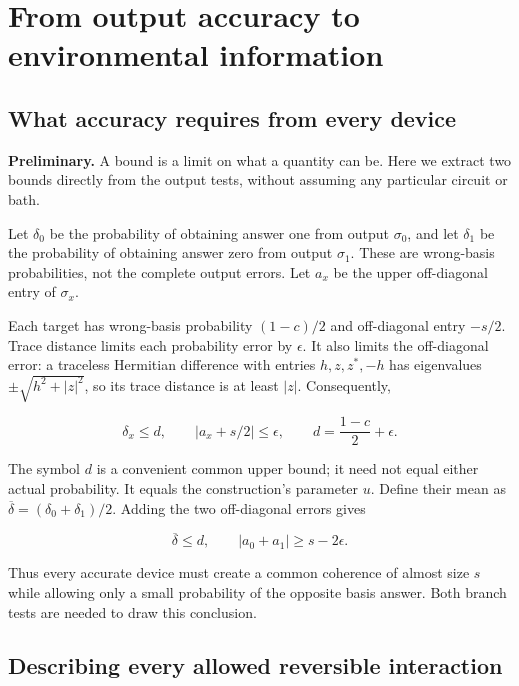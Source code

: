 \documentclass[11pt,letterpaper]{article}
\begin{document}
\section{From output accuracy to environmental information}\label{sec:information}

\subsection{What accuracy requires from every device}\label{subsec:output-accuracy}

\textbf{Preliminary.} A bound is a limit on what a quantity can be. Here we extract two bounds directly from the output tests, without assuming any particular circuit or bath.

Let \(\delta_{0}\) be the probability of obtaining answer one from output \(\sigma_{0}\), and let \(\delta_{1}\) be the probability of obtaining answer zero from output \(\sigma_{1}\). These are wrong-basis probabilities, not the complete output errors. Let \(a_{x}\) be the upper off-diagonal entry of \(\sigma_{x}\).

Each target has wrong-basis probability \((1 - c)/2\) and off-diagonal entry \(- s/2\). Trace distance limits each probability error by \(\epsilon\). It also limits the off-diagonal error: a traceless Hermitian difference with entries \(h,z,z^{*}, - h\) has eigenvalues \(\pm \sqrt{h^{2} + |z|^{2}}\), so its trace distance is at least \(|z|\). Consequently,

\[\delta_{x} \leq d,\quad\quad\left| a_{x} + s/2 \right| \leq \epsilon,\quad\quad d = \frac{1 - c}{2} + \epsilon.\]

The symbol \(d\) is a convenient common upper bound; it need not equal either actual probability. It equals the construction's parameter \(u\). Define their mean as \(\overline{\delta} = \left( \delta_{0} + \delta_{1} \right)/2\). Adding the two off-diagonal errors gives

\[\overline{\delta} \leq d,\quad\quad\left| a_{0} + a_{1} \right| \geq s - 2\epsilon.\]

Thus every accurate device must create a common coherence of almost size \(s\) while allowing only a small probability of the opposite basis answer. Both branch tests are needed to draw this conclusion.

\subsection{Describing every allowed reversible interaction}\label{subsec:arbitrary-unitary}
\end{document}

